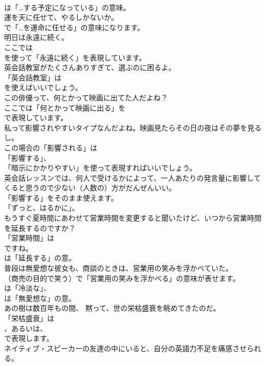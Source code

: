 \documentclass[8pt]{extreport}
\begin{document}
\begin{CJK}{UTF8}{min}
\\	は「…する予定になっている」の意味。	
\\	運を天に任せて、やるしかないか。 
\\	で「…を運命に任せる」の意味になります。	
\\	明日は永遠に続く。 
\\	ここでは 
\\	を使って「永遠に続く」を表現しています。	
\\	英会話教室がたくさんありすぎて、選ぶのに困るよ。 
\\	「英会話教室」は 
\\	を使えばいいでしょう。	
\\	この俳優って、何とかって映画に出てた人だよね？ 
\\	ここでは「何とかって映画に出る」を 
\\	で表現しています。	
\\	私って影響されやすいタイプなんだよね。映画見たらその日の夜はその夢を見るし。 
\\	この場合の「影響される」は
\\	「影響する」、
\\	「暗示にかかりやすい」を使って表現すればいいでしょう。	
\\	英会話レッスンでは、何人で受けるかによって、一人あたりの発言量に影響してくると思うので少ない（人数の）方がだんぜんいい。 
\\	「影響する」をそのまま使えます。
\\	「ずっと、はるかに」。	
\\	もうすぐ夏時間にあわせて営業時間を変更すると聞いたけど、いつから営業時間を延長するのですか？ 
\\	「営業時間」は 
\\	ですね。
\\	は「延長する」の意。	
\\	普段は無愛想な彼女も、商談のときは、営業用の笑みを浮かべていた。 
\\	（商売の目的で笑う）で「営業用の笑みを浮かべる」の意味が表せます。
\\	は「冷淡な」、
\\	は「無愛想な」の意。	
\\	あの樹は数百年もの間、 黙って、世の栄枯盛衰を眺めてきたのだ。 
\\	「栄枯盛衰」は
\\	、あるいは、
\\	で表現します。	
\\	ネイティブ・スピーカーの友達の中にいると、自分の英語力不足を痛感させられる。 

\end{CJK}
\end{document}
